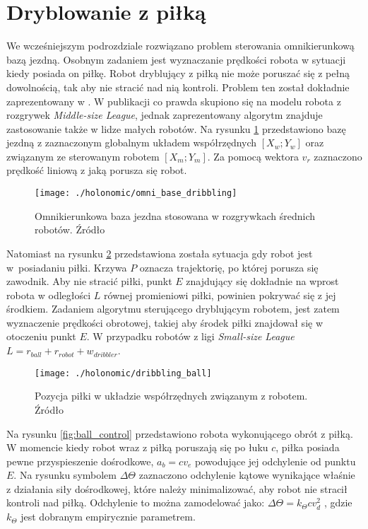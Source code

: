 \section{Dryblowanie z piłką}
We wcześniejszym podrozdziale rozwiązano problem sterowania omnikierunkową bazą jezdną. Osobnym zadaniem jest wyznaczanie prędkości robota w sytuacji kiedy posiada on piłkę.
Robot dryblujący z piłką nie może poruszać się z pełną dowolnością, tak aby nie stracić nad nią kontroli. Problem ten został dokładnie zaprezentowany w \cite{dribbling}. W publikacji co prawda skupiono
się na modelu robota z rozgrywek \emph{Middle-size League}, jednak zaprezentowany algorytm znajduje zastosowanie także w lidze małych robotów.
Na rysunku \ref{fig:omni_base_dribbling} przedstawiono bazę jezdną z zaznaczonym globalnym układem współrzędnych $[X_w;Y_w]$ oraz związanym ze sterowanym robotem $[X_m;Y_m]$. Za pomocą wektora $v_r$ zaznaczono
prędkość liniową z jaką porusza się robot.
\begin{figure}[h]
\centering
\texttt{[image: ./holonomic/omni\_base\_dribbling]}
\caption{Omnikierunkowa baza jezdna stosowana w rozgrywkach średnich robotów. Źródło \cite{dribbling}}\label{fig:omni_base_dribbling}
\end{figure}
Natomiast na rysunku \ref{fig:dribbling_ball} przedstawiona została sytuacja gdy robot jest w~posiadaniu piłki. Krzywa $P$ oznacza trajektorię, po której porusza się zawodnik. Aby nie stracić piłki,
punkt $E$ znajdujący się dokładnie na wprost robota w odległości $L$ równej promieniowi piłki, powinien pokrywać się z jej środkiem. Zadaniem algorytmu sterującego dryblującym robotem, jest zatem wyznaczenie
prędkości obrotowej, takiej aby środek piłki znajdował się w otoczeniu punkt $E$. W przypadku robotów z ligi \emph{Small-size League} $L=r_{ball}+r_{robot} +w_{dribbler}$.
\begin{figure}[h]
\centering
\texttt{[image: ./holonomic/dribbling\_ball]}
\caption{ Pozycja piłki w układzie współrzędnych związanym z robotem. Źródło \cite{dribbling} }\label{fig:dribbling_ball}
\end{figure}
Na rysunku \ref{fig:ball_control} przedstawiono robota wykonującego obrót z piłką. W momencie kiedy robot wraz z piłką poruszają się po łuku $c$, piłka posiada pewne przyspieszenie dośrodkowe,
$a_b=cv_e$ powodujące jej odchylenie od punktu $E$. Na rysunku symbolem $\Delta\Theta$ zaznaczono odchylenie kątowe wynikające właśnie z działania siły dośrodkowej, które należy minimalizować,
 aby robot nie stracił kontroli nad piłką. Odchylenie to można zamodelować jako: $\Delta\Theta=k_{\Theta}cv_{d}^2$ , gdzie $k_{\Theta}$ jest dobranym empirycznie parametrem.

